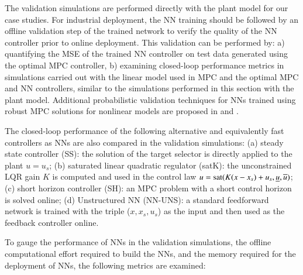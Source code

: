 \documentclass[preprint,5p, twocolumn, authoryear]{elsarticle}
\begin{document}
The validation simulations are performed directly with the plant model for our
case studies. For industrial deployment, the NN training should be followed by
an offline validation step of the trained network to verify the quality of the
NN controller prior to online deployment. This validation can be performed by:
a) quantifying the MSE of the trained NN controller on test data generated using
the optimal MPC controller, b) examining closed-loop performance metrics in
simulations carried out with the linear model used in MPC and the optimal MPC
and NN controllers, similar to the simulations performed in this section with
the plant model. Additional probabilistic validation techniques for NNs trained
using robust MPC solutions for nonlinear models are proposed in
\cite{karg:alamo:lucia:2019} and \cite{hertneck:kohler:trimpe:allgower:2018}.

The closed-loop performance of the following alternative and equivalently fast
controllers as NNs are also compared in the validation simulations: (a) steady
state controller (SS): the solution of the target selector is directly applied
to the plant $u = u_s$; (b) saturated linear quadratic regulator (satK): the
unconstrained LQR gain $K$ is computed and used in the control law $u =
\textnormal{sat}(K(x-x_s) + u_s, \underline{u}, \overline{u})$; (c) short
horizon controller (SH): an MPC problem with a short control horizon is solved
online; (d) Unstructured NN (NN-UNS): a standard feedforward network is trained
with the triple ($x, x_s, u_s$) as the input and then used as the feedback
controller online.

To gauge the performance of NNs in the validation simulations, the offline
computational effort required to build the NNs, and the memory required for the
deployment of NNs, the following metrics are examined:
\end{document}
